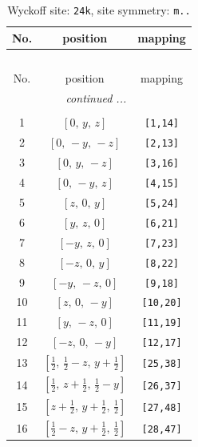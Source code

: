 \documentclass[fleqn,8pt]{jsarticle}
\begin{document}
\renewcommand{\arraystretch}{1.2}
\begin{longtable}{ccc}
\caption{Wyckoff site: {\tt 24k}, site symmetry: {\tt m..}}
 \\
 \hline \hline
No. & position & mapping \\ \hline \endfirsthead

\multicolumn{2}{l}{\tablename\ \thetable{}} \\
 \hline \hline
No. & position & mapping \\ \hline \endhead

 \hline \hline
\multicolumn{2}{r}{\footnotesize\it continued ...} \\ \endfoot

 \hline \hline
\multicolumn{2}{r}{} \\ \endlastfoot

1 & $\left[ 0,\, y,\, z \right]$ & {\tt [1,14]} \\ \hline
2 & $\left[ 0,\, - y,\, - z \right]$ & {\tt [2,13]} \\ \hline
3 & $\left[ 0,\, y,\, - z \right]$ & {\tt [3,16]} \\ \hline
4 & $\left[ 0,\, - y,\, z \right]$ & {\tt [4,15]} \\ \hline
5 & $\left[ z,\, 0,\, y \right]$ & {\tt [5,24]} \\ \hline
6 & $\left[ y,\, z,\, 0 \right]$ & {\tt [6,21]} \\ \hline
7 & $\left[ - y,\, z,\, 0 \right]$ & {\tt [7,23]} \\ \hline
8 & $\left[ - z,\, 0,\, y \right]$ & {\tt [8,22]} \\ \hline
9 & $\left[ - y,\, - z,\, 0 \right]$ & {\tt [9,18]} \\ \hline
10 & $\left[ z,\, 0,\, - y \right]$ & {\tt [10,20]} \\ \hline
11 & $\left[ y,\, - z,\, 0 \right]$ & {\tt [11,19]} \\ \hline
12 & $\left[ - z,\, 0,\, - y \right]$ & {\tt [12,17]} \\ \hline
13 & $\left[ \frac{1}{2},\, \frac{1}{2} - z,\, y + \frac{1}{2} \right]$ & {\tt [25,38]} \\ \hline
14 & $\left[ \frac{1}{2},\, z + \frac{1}{2},\, \frac{1}{2} - y \right]$ & {\tt [26,37]} \\ \hline
15 & $\left[ z + \frac{1}{2},\, y + \frac{1}{2},\, \frac{1}{2} \right]$ & {\tt [27,48]} \\ \hline
16 & $\left[ \frac{1}{2} - z,\, y + \frac{1}{2},\, \frac{1}{2} \right]$ & {\tt [28,47]} \\ \hline

\end{longtable}
\end{document}
